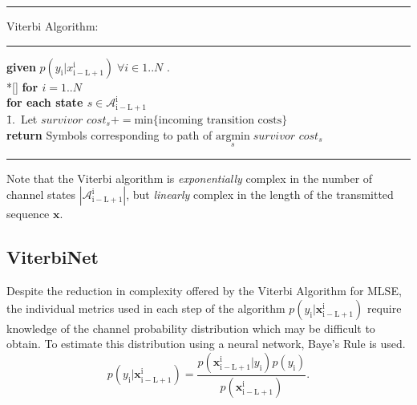 \documentclass[12pt,a4paper]{report}
\begin{document}
    \noindent\rule[16pt]{\textwidth}{0.6pt}
	Viterbi Algorithm:

    \noindent\rule[10pt]{\textwidth}{0.4pt}
    {\footnotesize
    \begin{tabbing}
        {\bf given} $p(y_{\mathrm{i}}|x_{\mathrm{i-L+1}}^{\mathrm{i}}) \; \forall i \in {1..N}$ . \\*[\smallskipamount]
        {\bf for $i = 1..N $} \\
         \qquad \= {\bf for each state $s \in \mathcal{A}_{\mathrm{i-L+1}}^{\mathrm{i}}$}\\
        \qquad \qquad \= 1.\ Let $\textit{survivor cost}_{s}  += \text{min}\{\text{incoming transition costs}\}$ \\
        {\bf return} Symbols corresponding to path of $\underset{s}{\text{argmin}} \; \textit{survivor cost}_{s} $
    \end{tabbing}}
    \noindent\rule[10pt]{\textwidth}{0.4pt}


Note that the Viterbi algorithm is \emph{exponentially} complex in the number of channel states $|\mathcal{A}_{\mathrm{i-L+1}}^{\mathrm{i}}|$, but \emph{linearly} complex in the length of the transmitted sequence $\mathbf{x}$. 


\subsection{ViterbiNet}
Despite the reduction in complexity offered by the Viterbi Algorithm for MLSE, the individual metrics used in each step of the algorithm 
$p(y_{\mathrm{i}}|\mathbf{x}_{\mathrm{i-L+1}}^{\mathrm{i}}) $ require knowledge of the channel probability distribution which may be difficult to obtain. To estimate this distribution using a neural network, Baye's Rule is used. 
\begin{equation}
p(y_{\mathrm{i}}|\mathbf{x}_{\mathrm{i-L+1}}^{\mathrm{i}}) = 
\frac
{p(\mathbf{x}_{\mathrm{i-L+1}}^{\mathrm{i}}|y_{\mathrm{i}})p(y_{\mathrm{i}})}
{p(\mathbf{x}_{\mathrm{i-L+1}}^{\mathrm{i}})}.
\end{equation}
\end{document}
